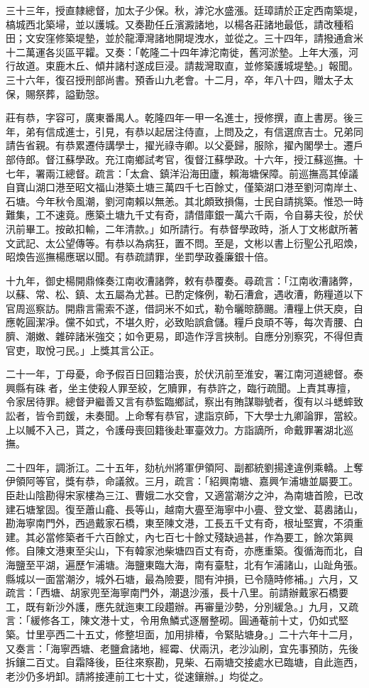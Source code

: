 \begin{pinyinscope}
三十三年，授直隸總督，加太子少保。秋，滹沱水盛漲。廷璋請於正定西南築堤，槁城西北築埽，並以護城。又奏勘任丘濱澱諸地，以楊各莊諸地最低，請改種稻田；文安窪修築堤墊，並於龍潭灣諸地開堤洩水，並從之。三十四年，請撥通倉米十二萬運各災區平糶。又奏：「乾隆二十四年滹沱南徙，舊河淤墊。上年大漲，河行故道。束鹿木丘、傾井諸村遂成巨浸。請裁灣取直，並修築護城堤墊。」報聞。三十六年，復召授刑部尚書。預香山九老會。十二月，卒，年八十四，贈太子太保，賜祭葬，謚勤愨。

莊有恭，字容可，廣東番禺人。乾隆四年一甲一名進士，授修撰，直上書房。後三年，弟有信成進士，引見，有恭以起居注侍直，上問及之，有信選庶吉士。兄弟同請告省親。有恭累遷侍講學士，擢光祿寺卿。以父憂歸，服除，擢內閣學士。遷戶部侍郎。督江蘇學政。充江南鄉試考官，復督江蘇學政。十六年，授江蘇巡撫。十七年，署兩江總督。疏言：「太倉、鎮洋沿海田廬，賴海塘保障。前巡撫高其倬議自寶山湖口港至昭文福山港築土塘三萬四千七百餘丈，僅築湖口港至劉河南岸土、石塘。今年秋令風潮，劉河南賴以無恙。其北頗致損傷，士民自請挑築。惟恐一時難集，工不速竟。應築土塘九千丈有奇，請借庫銀一萬六千兩，令自募夫役，於伏汛前畢工。按畝扣輸，二年清款。」如所請行。有恭督學政時，浙人丁文彬獻所著文武記、太公望傳等。有恭以為病狂，置不問。至是，文彬以書上衍聖公孔昭煥，昭煥告巡撫楊應琚以聞。有恭疏請罪，坐罰學政養廉銀十倍。

十九年，御史楊開鼎條奏江南收漕諸弊，敕有恭覆奏。尋疏言：「江南收漕諸弊，以蘇、常、松、鎮、太五屬為尤甚。已酌定條例，勒石漕倉，遇收漕，飭糧道以下官周巡察訪。開鼎言需索不遂，借詞米不如式，勒令曬晾篩颺。漕糧上供天庾，自應乾圓潔凈。儻不如式，不堪久貯，必致貽誤倉儲。糧戶良頑不等，每次青腰、白臍、潮嫩、雜碎諸米強交；如令更易，即造作浮言挾制。自應分別察究，不得但責官吏，取悅刁民。」上獎其言公正。

二十一年，丁母憂，命予假百日回籍治喪，於伏汛前至淮安，署江南河道總督。泰興縣有硃者，坐主使殺人罪至絞，乞贖罪，有恭許之，臨行疏聞。上責其專擅，令家居待罪。總督尹繼善又言有恭監臨鄉試，察出有賄謀聯號者，復有以斗蟋蟀致訟者，皆令罰鍰，未奏聞。上命奪有恭官，逮詣京師，下大學士九卿論罪，當絞。上以贓不入己，貰之，令護母喪回籍後赴軍臺效力。方詣謫所，命戴罪署湖北巡撫。

二十四年，調浙江。二十五年，劾杭州將軍伊領阿、副都統劉揚達違例乘轎。上奪伊領阿等官，獎有恭，命議敘。三月，疏言：「紹興南塘、嘉興乍浦塘並屬要工。臣赴山陰勘得宋家樓為三江、曹娥二水交會，又適當潮汐之沖，為南塘首險，已改建石塘鞏固。復至蕭山龕、長等山，越南大亹至海寧中小亹、登文堂、葛嶴諸山，勘海寧南門外，西過戴家石橋，東至陳文港，工長五千丈有奇，根址堅實，不須重建。其必當修築者千六百餘丈，內七百七十餘丈殘缺過甚，作為要工，餘次第興修。自陳文港東至尖山，下有韓家池柴塘四百丈有奇，亦應重築。復循海而北，自海鹽至平湖，遍歷乍浦塘。海鹽東臨大海，南有臺駐，北有乍浦諸山，山趾角張。縣城以一面當潮汐，城外石塘，最為險要，間有沖損，已令隨時修補。」六月，又疏言：「西塘、胡家兜至海寧南門外，潮退沙漲，長十八里。前請辦戴家石橋要工，既有新沙外護，應先就迤東工段趲辦。再審量沙勢，分別緩急。」九月，又疏言：「緩修各工，陳文港十丈，令用魚鱗式逐層整砌。圓通菴前十丈，仍如式堅築。廿里亭西二十五丈，修整坦面，加用排椿，令緊貼塘身。」二十六年十二月，又奏言：「海寧西塘、老鹽倉諸地，經霉、伏兩汛，老沙汕刷，宜先事預防，先後拆鑲二百丈。自霜降後，臣往來察勘，見柴、石兩塘交接處水已臨塘，自此迤西，老沙仍多坍卸。請將接連前工七十丈，從速鑲辦。」均從之。


\end{pinyinscope}
